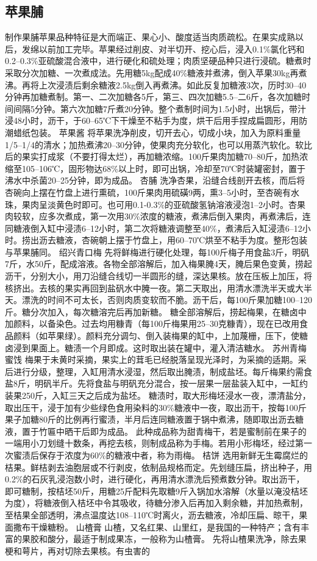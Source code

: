\documentclass{ctexbook}
\begin{document}
\subsection{苹果脯}
制作果脯苹果品种特征是大而端正、果心小、酸度适当肉质疏松。在果实成熟以后，发绵以前加工完毕。苹果经过削皮、对半切开、挖心后，浸入0.1\%氯化钙和0.2--0.3\%亚硫酸混合液中，进行硬化和硫处理；肉质坚硬品种只进行浸硫。糖煮时采取分次加糖、一次煮成法。先用糖5kg配成40\%糖液并煮沸，倒入苹果30kg再煮沸。再将上次浸渍后剩余糖液2.5kg倒入再煮沸。如此反复加糖液3次，历时30--40分钟再加糖煮制。第一、二次加糖各5斤，第三、四次加糖5.5--二6斤，各次加糖时间间隔5分钟。第六次加糖7斤煮20分钟。整个煮制时间为1.5小时，出锅后，带汁浸48小时，沥干，于60--65℃下干燥至不粘手为度，烘干后用手捏成扁圆形，用防潮蜡纸包装。
苹果酱
将苹果洗净削皮，切开去心，切成小块，加入为原料重量1/5--1/4的清水；加热煮沸20--30分钟，使果肉充分软化，也可以用蒸汽软化。软比后的果实打成浆（不要打得太烂），再加糖浓缩。100斤果肉加糖70--80斤，加热浓缩至105--106℃，固形物达68\%以上时，即可出锅，冷却至70℃时装罐密封，置于沸水中杀菌20--25分钟，即为成品。
杏脯
洗净杏果，沿缝合线剖开去核，而后将杏碗向上摆在竹盘上进行熏硫，100斤果肉用硫磺9两，熏3--5小时，至杏碗有水珠，果肉呈淡黄色时即可。也可用0.1-0.3\%的亚硫酸氢钠溶液浸泡1--2小时。杏果肉较软，应多次煮成，第一次用30\%浓度的糖液，煮沸后倒入果肉，再煮沸后，连同糖液倒入缸中浸渍6--12小时，第二次将糖液调整至40\%，煮沸后入缸浸渍6--12小时。捞出沥去糖液，杏碗朝上摆于竹盘上，用60--70℃烘至不粘手为度。整形包装与苹果脯同。
绍兴青口梅
先将鲜梅进行硬化处理，每100斤梅子用食盐3斤，明矾7斤，水50斤，配成溶液。各物全部溶解后，加入梅果腌4天，腌后果色变黄，捞起沥干，分别大小，用刀沿缝合线切一半圆形的缝，深达果核。放在压板上加压，将核挤出。去核的果实再回到盐矾水中腌一夜。第二天取出，用清水漂洗半天或大半天。漂洗的时间不可太长，否则肉质变软而不脆。沥干后，每100斤果加糖100--120斤。糖分次加入，每次糖溶完后再加新糖。
糖全部溶解后，捞起梅果，在糖卤中加颜料，以备染色。过去均用糠青（每100斤梅果用25--30克糠青），现在已改用食品颜料（如苹果绿）。颜料充分调匀、倒入装梅果的缸中，上加蔑栅，压下，使糖卤浸到果面上。糖渍一个月即成。这时取出装在罐中，灌入清洁糖水。
苏州青梅蜜饯
梅果于未黄时采摘，果实上的茸毛已经脱落呈现光泽时，为采摘的适期。采后进行分级，整理，入缸用清水浸湿，然后取出腌渍，制成盐坯。每斤梅果约需食盐8斤，明矾半斤。先将食盐与明矾充分混合，按一层果一层盐装入缸中，一缸约装果250斤，入缸三天之后成为盐坯。
糖渍时，取大形梅坯浸水一夜，漂清盐分，取出压干，浸于加有少些绿色食用染料的30\%糖液中一夜，取出沥干，按每100斤果子加糖80斤的比例再行蜜渍，半月后连同糖液置于锅中煮沸，随即取出沥去糖液，置于竹匾中晒干后即为成品。
此种成品称为甜青梅干，若是蜜制前在果子的一端用小刀划缝十数条，再挖去核，则制成品称为手梅。若用小形梅坯，经过第一次蜜渍后保存于浓度为60\%的糖液中者，称为雨梅。
桔饼
选用新鲜无生霉腐烂的桔果。鲜桔剥去油胞层或不行剥皮，依制品规格而定。先划缝压扁，挤出种子，用0.2\%的石灰乳浸泡数小时，进行硬化，再用清水漂洗后预煮数分钟。取出沥干，即可糖制，按桔坯50斤，用糖25斤配料先取糖9斤入锅加水溶解（水量以淹没桔坯为度），将糖液倒入桔坯中令其吸收，待糖分渗入后再加入剩余糖，并加热煮制，至桔果全部透明，沸点温度达108--110℃时离火，沥去糖液，冷却压扁、晾干，果面撒布干燥糖粉。
山楂膏
山楂，又名红果、山里红，是我国的一种特产；含有丰富的果胶和酸分，最适于制成果冻，一般称为山楂膏。
先将山楂果洗净，除去果梗和萼片，再对切除去果核。有虫害的
\end{document}
